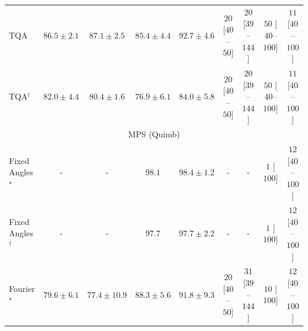 \begin{tabular}{l|cccc|cccc|}
TQA & {\cellcolor[HTML]{8C80BB}} \color[HTML]{F1F1F1} $86.5\pm 2.1$ & {\cellcolor[HTML]{8C79B8}} \color[HTML]{F1F1F1} $87.1\pm 2.5$ & {\cellcolor[HTML]{8C8FC2}} \color[HTML]{F1F1F1} $85.4\pm 4.4$ & {\cellcolor[HTML]{863394}} \color[HTML]{F1F1F1} $92.7\pm 4.6$ & {\cellcolor[HTML]{FDE4E1}} \color[HTML]{000000} $20$ [$40$--$50$] & {\cellcolor[HTML]{FDE4E1}} \color[HTML]{000000} $20$ [$39$--$144$] & {\cellcolor[HTML]{FCC0BF}} \color[HTML]{000000} $50$ [$40$--$100$] & {\cellcolor[HTML]{FEEEEA}} \color[HTML]{000000} $11$ [$40$--$100$] \\
TQA$^\dagger$ & {\cellcolor[HTML]{9AB4D6}} \color[HTML]{000000} $82.0\pm 4.4$ & {\cellcolor[HTML]{A6C2DD}} \color[HTML]{000000} $80.4\pm 1.6$ & {\cellcolor[HTML]{C8DAEA}} \color[HTML]{000000} $76.9\pm 6.1$ & {\cellcolor[HTML]{909ECA}} \color[HTML]{F1F1F1} $84.0\pm 5.8$ & {\cellcolor[HTML]{FDE4E1}} \color[HTML]{000000} $20$ [$40$--$50$] & {\cellcolor[HTML]{FDE4E1}} \color[HTML]{000000} $20$ [$39$--$144$] & {\cellcolor[HTML]{FCC0BF}} \color[HTML]{000000} $50$ [$40$--$100$] & {\cellcolor[HTML]{FEEEEA}} \color[HTML]{000000} $11$ [$40$--$100$] \\
\cline{1-9}
\multicolumn{9}{c}{\rule{0pt}{8pt}MPS (Quimb)} \\
\midrule
Fixed Angles$^\star$ & {\cellcolor[HTML]{000000}} \color[HTML]{F1F1F1} {\cellcolor{white}} \color{black} - & {\cellcolor[HTML]{000000}} \color[HTML]{F1F1F1} {\cellcolor{white}} \color{black} - & {\cellcolor[HTML]{6E2706}} \color[HTML]{F1F1F1} $98.1$ & {\cellcolor[HTML]{692606}} \color[HTML]{F1F1F1} $98.4\pm 1.2$ & {\cellcolor[HTML]{000000}} \color[HTML]{F1F1F1} {\cellcolor{white}} \color{black} - & {\cellcolor[HTML]{000000}} \color[HTML]{F1F1F1} {\cellcolor{white}} \color{black} - & {\cellcolor[HTML]{FFF7F3}} \color[HTML]{000000} $1$ [$100$] & {\cellcolor[HTML]{FEECE9}} \color[HTML]{000000} $12$ [$40$--$100$] \\
Fixed Angles$^\dagger$ & {\cellcolor[HTML]{000000}} \color[HTML]{F1F1F1} {\cellcolor{white}} \color{black} - & {\cellcolor[HTML]{000000}} \color[HTML]{F1F1F1} {\cellcolor{white}} \color{black} - & {\cellcolor[HTML]{742905}} \color[HTML]{F1F1F1} $97.7$ & {\cellcolor[HTML]{742905}} \color[HTML]{F1F1F1} $97.7\pm 2.2$ & {\cellcolor[HTML]{000000}} \color[HTML]{F1F1F1} {\cellcolor{white}} \color{black} - & {\cellcolor[HTML]{000000}} \color[HTML]{F1F1F1} {\cellcolor{white}} \color{black} - & {\cellcolor[HTML]{FFF7F3}} \color[HTML]{000000} $1$ [$100$] & {\cellcolor[HTML]{FEECE9}} \color[HTML]{000000} $12$ [$40$--$100$] \\
Fourier$^\star$ & {\cellcolor[HTML]{FED36F}} \color[HTML]{000000} $79.6\pm 6.1$ & {\cellcolor[HTML]{FEE596}} \color[HTML]{000000} $77.4\pm 10.9$ & {\cellcolor[HTML]{EB6F14}} \color[HTML]{F1F1F1} $88.3\pm 5.6$ & {\cellcolor[HTML]{CB4B02}} \color[HTML]{F1F1F1} $91.8\pm 9.3$ & {\cellcolor[HTML]{FDE4E1}} \color[HTML]{000000} $20$ [$40$--$50$] & {\cellcolor[HTML]{FDD8D5}} \color[HTML]{000000} $31$ [$39$--$144$] & {\cellcolor[HTML]{FEEEEB}} \color[HTML]{000000} $10$ [$100$] & {\cellcolor[HTML]{FEECE9}} \color[HTML]{000000} $12$ [$40$--$100$] \\

\end{tabular}
